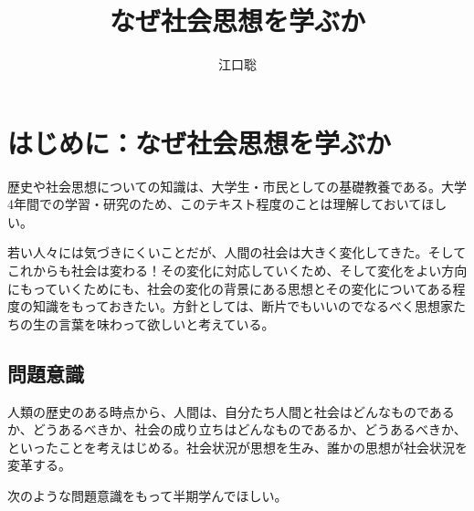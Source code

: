 \documentclass[autodetect-engine,dvipdfmx-if-dvi,ja=standard]{bxjsarticle} \usepackage{mystyle}
\author{江口聡}
\title{なぜ社会思想を学ぶか}
\begin{document}
\maketitle

\else
\chapter*{はじめに：なぜ社会思想を学ぶか}
\fi
{}

歴史や社会思想についての知識は、大学生・市民としての基礎教養である。大学4年間での学習・研究のため、このテキスト程度のことは理解しておいてほしい。

若い人々には気づきにくいことだが、人間の社会は大きく変化してきた。そしてこれからも社会は変わる！その変化に対応していくため、そして変化をよい方向にもっていくためにも、社会の変化の背景にある思想とその変化についてある程度の知識をもっておきたい。方針としては、断片でもいいのでなるべく思想家たちの生の言葉を味わって欲しいと考えている。







\section{問題意識}


人類の歴史のある時点から、人間は、自分たち人間と社会はどんなものであるか、どうあるべきか、社会の成り立ちはどんなものであるか、どうあるべきか、といったことを考えはじめる。社会状況が思想を生み、誰かの思想が社会状況を変革する。





次のような問題意識をもって半期学んでほしい。
\end{document}
